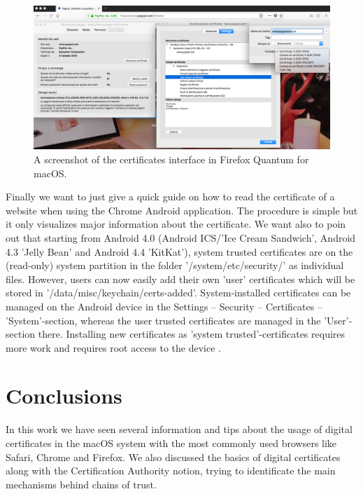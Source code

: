 \documentclass[11pt]{article}
\begin{document}
\begin{figure}[h]
\includegraphics[width=1.0\textwidth]{firefox-hw5-1642557}
\centering
\caption{A screenshot of the certificates interface in Firefox Quantum for macOS.}
\label{fig:firefox}
\end{figure}

Finally we want to just give a quick guide on how to read the certificate of a website when using the Chrome Android application. The procedure is simple but it only visualizes major information about the certificate. We want also to poin out that starting from Android 4.0 (Android ICS/'Ice Cream Sandwich', Android 4.3 'Jelly Bean' and Android 4.4 'KitKat'), system trusted certificates are on the (read-only) system partition in the folder '/system/etc/security/' as individual files. However, users can now easily add their own 'user' certificates which will be stored in '/data/misc/keychain/certs-added'. System-installed certificates can be managed on the Android device in the Settings -- Security -- Certificates -- 'System'-section, whereas the user trusted certificates are managed in the 'User'-section there. Installing new certificates as 'system trusted'-certificates requires more work and requires root access to the device \cite{android}.

\section{Conclusions}
In this work we have seen several information and tips about the usage of digital certificates in the macOS system with the most commonly used browsers like Safari, Chrome and Firefox. We also discussed the basics of digital certificates along with the Certification Authority notion, trying to identificate the main mechanisms behind chains of trust. 

\nocite{*} %
 

\end{document}
